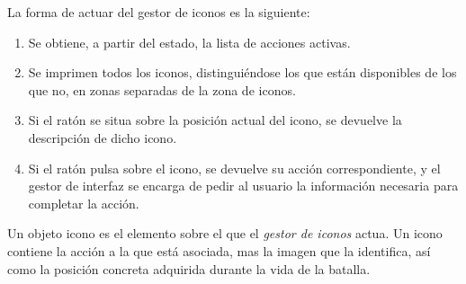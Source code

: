 La forma de actuar del gestor de iconos es la siguiente:
\begin{enumerate}
\item Se obtiene, a partir del estado, la lista de acciones
  activas.
\item Se imprimen todos los iconos, distinguiéndose los que están
  disponibles de los que no, en zonas separadas de la zona de iconos.
\item Si el ratón se situa sobre la posición actual del icono, se
  devuelve la descripción de dicho icono.
\item Si el ratón pulsa sobre el icono, se devuelve su acción
  correspondiente, y el gestor de interfaz se encarga de pedir al
  usuario la información necesaria para completar la acción.
\end{enumerate}

Un objeto icono es el elemento sobre el que el \emph{gestor de iconos}
actua. Un icono contiene la acción a la que está asociada, mas la
imagen que la identifica, así como la posición concreta adquirida
durante la vida de la batalla.